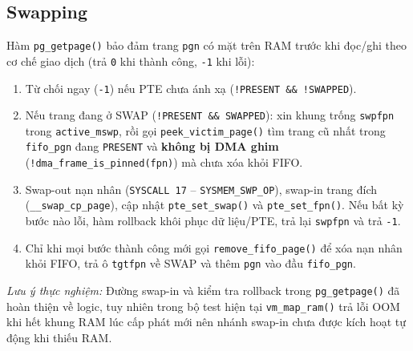 \documentclass[12pt,a4paper]{article}
\begin{document}
	\subsection{Swapping}
	Hàm \texttt{pg\_getpage()} bảo đảm trang \texttt{pgn} có mặt trên RAM trước khi đọc/ghi theo cơ chế giao dịch (trả \texttt{0} khi thành công, \texttt{-1} khi lỗi):
	\begin{enumerate}[leftmargin=*]
		\item Từ chối ngay (\texttt{-1}) nếu PTE chưa ánh xạ (\texttt{!PRESENT \&\& !SWAPPED}).
		\item Nếu trang đang ở SWAP (\texttt{!PRESENT \&\& SWAPPED}): xin khung trống \texttt{swpfpn} trong \texttt{active\_mswp}, rồi gọi \texttt{peek\_victim\_page()} tìm trang cũ nhất trong \texttt{fifo\_pgn} đang \texttt{PRESENT} và \textbf{không bị DMA ghim} (\texttt{!dma\_frame\_is\_pinned(fpn)}) mà chưa xóa khỏi FIFO.
		\item Swap-out nạn nhân (\texttt{SYSCALL 17} -- \texttt{SYSMEM\_SWP\_OP}), swap-in trang đích (\texttt{\_\_swap\_cp\_page}), cập nhật \texttt{pte\_set\_swap()} và \texttt{pte\_set\_fpn()}. Nếu bất kỳ bước nào lỗi, hàm rollback khôi phục dữ liệu/PTE, trả lại \texttt{swpfpn} và trả \texttt{-1}.
		\item Chỉ khi mọi bước thành công mới gọi \texttt{remove\_fifo\_page()} để xóa nạn nhân khỏi FIFO, trả ô \texttt{tgtfpn} về SWAP và thêm \texttt{pgn} vào đầu \texttt{fifo\_pgn}.
	\end{enumerate}
	\textit{Lưu ý thực nghiệm:} Đường swap-in và kiểm tra rollback trong \texttt{pg\_getpage()} đã hoàn thiện về logic, tuy nhiên trong bộ test hiện tại \texttt{vm\_map\_ram()} trả lỗi OOM khi hết khung RAM lúc cấp phát mới nên nhánh swap-in chưa được kích hoạt tự động khi thiếu RAM.
\end{document}
